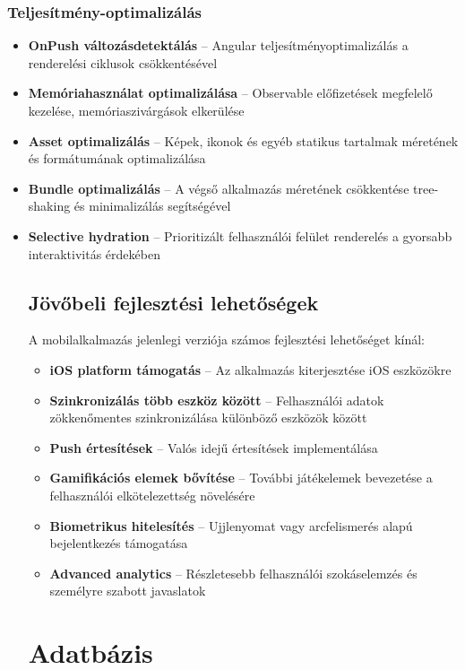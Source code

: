 \documentclass[12pt]{report}
\begin{document}
\subsection{Teljesítmény-optimalizálás}
\begin{itemize}
    \item \textbf{OnPush változásdetektálás} -- Angular teljesítményoptimalizálás a renderelési ciklusok csökkentésével
    \item \textbf{Memóriahasználat optimalizálása} -- Observable előfizetések megfelelő kezelése, memóriaszivárgások elkerülése
    \item \textbf{Asset optimalizálás} -- Képek, ikonok és egyéb statikus tartalmak méretének és formátumának optimalizálása
    \item \textbf{Bundle optimalizálás} -- A végső alkalmazás méretének csökkentése tree-shaking és minimalizálás segítségével
    \item \textbf{Selective hydration} -- Prioritizált felhasználói felület renderelés a gyorsabb interaktivitás érdekében

\section{Jövőbeli fejlesztési lehetőségek}
A mobilalkalmazás jelenlegi verziója számos fejlesztési lehetőséget kínál:
\begin{itemize}
    \item \textbf{iOS platform támogatás} -- Az alkalmazás kiterjesztése iOS eszközökre
    \item \textbf{Szinkronizálás több eszköz között} -- Felhasználói adatok zökkenőmentes szinkronizálása különböző eszközök között
    \item \textbf{Push értesítések} -- Valós idejű értesítések implementálása
    \item \textbf{Gamifikációs elemek bővítése} -- További játékelemek bevezetése a felhasználói elkötelezettség növelésére
    \item \textbf{Biometrikus hitelesítés} -- Ujjlenyomat vagy arcfelismerés alapú bejelentkezés támogatása
    \item \textbf{Advanced analytics} -- Részletesebb felhasználói szokáselemzés és személyre szabott javaslatok
\end{itemize}

\chapter{Adatbázis}

\end{itemize}
\end{document}
